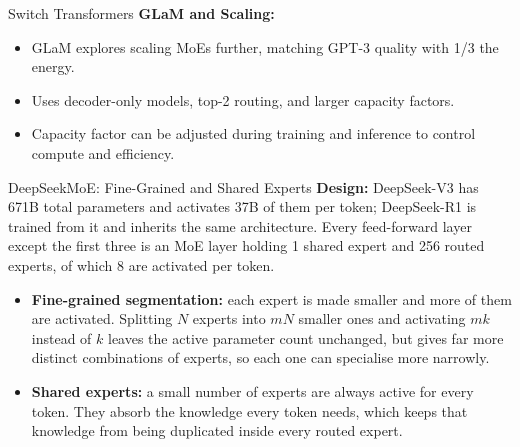 \begin{frame}[allowframebreaks]{Switch Transformers}
    \textbf{GLaM and Scaling:}
    \begin{itemize}
        \item GLaM explores scaling MoEs further, matching GPT-3 quality with 1/3 the energy.
        \item Uses decoder-only models, top-2 routing, and larger capacity factors.
        \item Capacity factor can be adjusted during training and inference to control compute and efficiency.
    \end{itemize}
\end{frame}

\begin{frame}{DeepSeekMoE: Fine-Grained and Shared Experts}
    \textbf{Design:} DeepSeek-V3 has 671B total parameters and activates 37B of them per token; DeepSeek-R1 is trained from it and inherits the same architecture. Every feed-forward layer except the first three is an MoE layer holding 1 shared expert and 256 routed experts, of which 8 are activated per token.

    \begin{itemize}
        \item \textbf{Fine-grained segmentation:} each expert is made smaller and more of them are activated. Splitting $N$ experts into $mN$ smaller ones and activating $mk$ instead of $k$ leaves the active parameter count unchanged, but gives far more distinct combinations of experts, so each one can specialise more narrowly.
        \item \textbf{Shared experts:} a small number of experts are always active for every token. They absorb the knowledge every token needs, which keeps that knowledge from being duplicated inside every routed expert.
    \end{itemize}
\end{frame}

